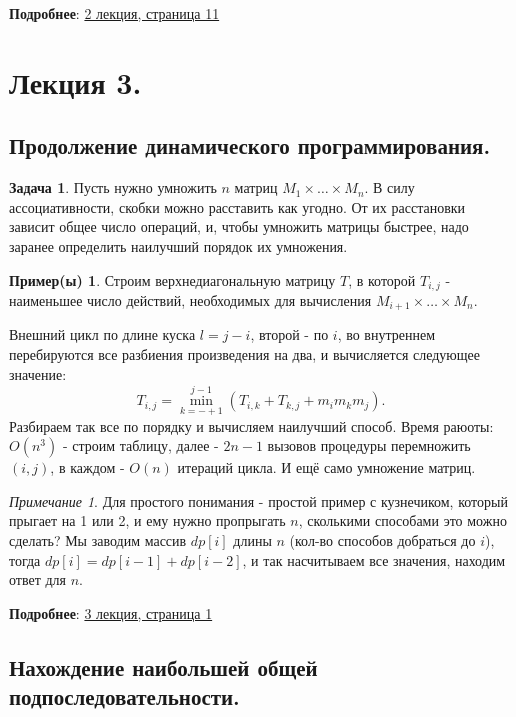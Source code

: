 \documentclass[a4paper]{article}
\theoremstyle{indented}
\theoremstyle{definition}
\newtheorem{exl}{Пример(ы)}
\newtheorem{prob}{Задача}
\theoremstyle{remark}
\newtheorem{remark}{Примечание}
\begin{document}
\textbf{Подробнее}: \href{https://users.math-cs.spbu.ru/~okhotin/teaching/algorithms_2020/okhotin_algorithms_2020_l2.pdf}{2 лекция, страница 11}

\section{Лекция 3.}

\subsection{Продолжение динамического программирования.}

\begin{prob}
    Пусть нужно умножить $n$ матриц $M_1 \times \ldots \times M_n$. В силу ассоциативности, скобки можно расставить как угодно. От их расстановки зависит общее число операций, и, чтобы умножить матрицы быстрее, надо заранее определить наилучший порядок их умножения.
\end{prob}

\begin{exl}
    Строим верхнедиагональную матрицу $T$, в которой $T_{i, j}$ - наименьшее число действий, необходимых для вычисления $M_{i+1} \times \ldots \times M_n$. \ 

    Внешний цикл по длине куска $l=j-i$, второй - по $i$, во внутреннем перебируются все разбиения произведения на два, и вычисляется следующее значение:
    \[
        T_{i, j}=\min_{k=-+1}^{j-1}(T_{i, k}+T_{k, j}+m_im_km_j). 
    \]
    Разбираем так все по порядку и вычисляем наилучший способ. Время раюоты: $O(n^3)$ - строим таблицу, далее - $2n-1$ вызовов процедуры перемножить $(i, j)$, в каждом - $O(n)$ итераций цикла. И ещё само умножение матриц.
\end{exl}

\begin{remark}
    Для простого понимания - простой пример с кузнечиком, который прыгает на 1 или 2, и ему нужно пропрыгать $n$, сколькими способами это можно сделать? Мы заводим массив $dp[i]$ длины $n$ (кол-во способов добраться до $i$), тогда $dp[i]=dp[i-1]+dp[i-2]$, и так насчитываем все значения, находим ответ для $n$. 
\end{remark}

\textbf{Подробнее}: \href{https://users.math-cs.spbu.ru/~okhotin/teaching/algorithms_2020/okhotin_algorithms_2020_l3.pdf}{3 лекция, страница 1}

\subsection{Нахождение наибольшей общей подпоследовательности.}
\end{document}
